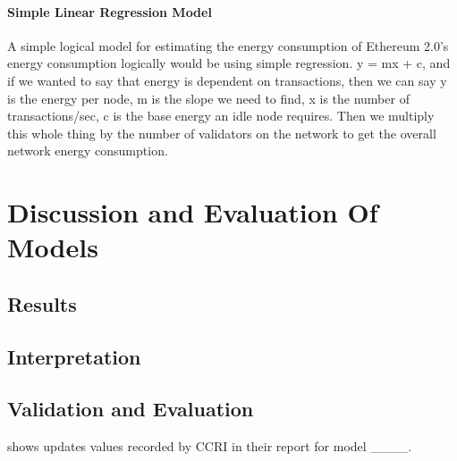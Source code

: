 \paragraph{ Simple Linear Regression Model}
A simple logical model for estimating the energy consumption of Ethereum 2.0's energy consumption logically would be using simple regression. y = mx + c, and if we wanted to say that energy is dependent on transactions, then we can say y is the energy per node, m is the slope we need to find, x is the number of transactions/sec, c is the base energy an idle node requires. Then we multiply this whole thing by the number of validators on the network to get the overall network energy consumption.

\section{Discussion and Evaluation Of Models}
\subsection{Results}
\subsection{Interpretation}


\subsection{Validation and Evaluation}


 shows updates values recorded by CCRI in their report \cite{CCRI:Network} for model \_\_\_\_. %

